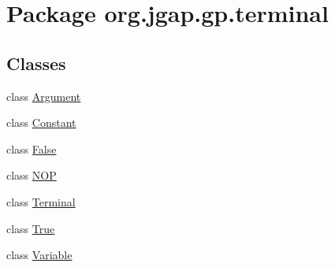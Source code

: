 \hypertarget{namespaceorg_1_1jgap_1_1gp_1_1terminal}{\section{Package org.\-jgap.\-gp.\-terminal}
\label{namespaceorg_1_1jgap_1_1gp_1_1terminal}
}
\subsection*{Classes}
\begin{DoxyCompactItemize}
\item 
class \hyperlink{classorg_1_1jgap_1_1gp_1_1terminal_1_1_argument}{Argument}
\item 
class \hyperlink{classorg_1_1jgap_1_1gp_1_1terminal_1_1_constant}{Constant}
\item 
class \hyperlink{classorg_1_1jgap_1_1gp_1_1terminal_1_1_false}{False}
\item 
class \hyperlink{classorg_1_1jgap_1_1gp_1_1terminal_1_1_n_o_p}{N\-O\-P}
\item 
class \hyperlink{classorg_1_1jgap_1_1gp_1_1terminal_1_1_terminal}{Terminal}
\item 
class \hyperlink{classorg_1_1jgap_1_1gp_1_1terminal_1_1_true}{True}
\item 
class \hyperlink{classorg_1_1jgap_1_1gp_1_1terminal_1_1_variable}{Variable}
\end{DoxyCompactItemize}
